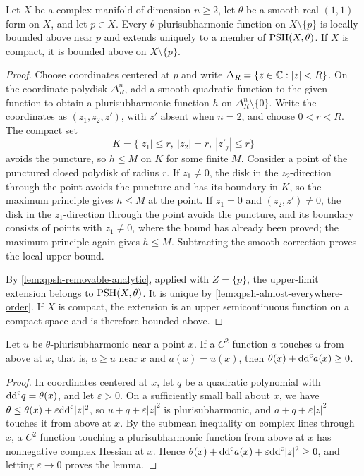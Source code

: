 \begin{lemma}\label{lem:projective-puncture-upper-bound}\label{lem:isolated-puncture-extension}
Let $X$ be a complex manifold of dimension $n\geq2$, let $\theta$ be a smooth real $(1,1)$-form on $X$, and let $p\in X$. Every $\theta$-plurisubharmonic function on $X\setminus\{p\}$ is locally bounded above near $p$ and extends uniquely to a member of $\mathrm{PSH}(X,\theta)$. If $X$ is compact, it is bounded above on $X\setminus\{p\}$.
\end{lemma}
\begin{proof}
Choose coordinates centered at $p$ and write $\Delta_R=\{z\in\mathbb C:|z|<R\}$. On the coordinate polydisk $\Delta_R^n$, add a smooth quadratic function to the given function to obtain a plurisubharmonic function $h$ on $\Delta_R^n\setminus\{0\}$. Write the coordinates as $(z_1,z_2,z')$, with $z'$ absent when $n=2$, and choose $0<r<R$. The compact set
\[
 K=\{|z_1|\leq r,\ |z_2|=r,\ |z'_j|\leq r\}
\]
avoids the puncture, so $h\leq M$ on $K$ for some finite $M$. Consider a point of the punctured closed polydisk of radius $r$. If $z_1\ne0$, the disk in the $z_2$-direction through the point avoids the puncture and has its boundary in $K$, so the maximum principle gives $h\leq M$ at the point. If $z_1=0$ and $(z_2,z')\ne0$, the disk in the $z_1$-direction through the point avoids the puncture, and its boundary consists of points with $z_1\neq0$, where the bound has already been proved; the maximum principle again gives $h\leq M$. Subtracting the smooth correction proves the local upper bound.

By \cref{lem:qpsh-removable-analytic}, applied with $Z=\{p\}$, the upper-limit extension belongs to $\mathrm{PSH}(X,\theta)$. It is unique by \cref{lem:qpsh-almost-everywhere-order}. If $X$ is compact, the extension is an upper semicontinuous function on a compact space and is therefore bounded above.
\end{proof}

\begin{lemma}\label{lem:qpsh-upper-test}
Let $u$ be $\theta$-plurisubharmonic near a point $x$. If a $C^2$ function $a$ touches $u$ from above at $x$, that is, $a\geq u$ near $x$ and $a(x)=u(x)$, then $\theta(x)+\mathrm{dd}^{\mathrm{c}} a(x)\geq0$.
\end{lemma}
\begin{proof}
In coordinates centered at $x$, let $q$ be a quadratic polynomial with $\mathrm{dd}^{\mathrm{c}} q=\theta(x)$, and let $\varepsilon>0$. On a sufficiently small ball about $x$, we have $\theta\leq\theta(x)+\varepsilon\mathrm{dd}^{\mathrm{c}}|z|^2$, so $u+q+\varepsilon|z|^2$ is plurisubharmonic, and $a+q+\varepsilon|z|^2$ touches it from above at $x$. By the submean inequality on complex lines through $x$, a $C^2$ function touching a plurisubharmonic function from above at $x$ has nonnegative complex Hessian at $x$. Hence $\theta(x)+\mathrm{dd}^{\mathrm{c}} a(x)+\varepsilon\mathrm{dd}^{\mathrm{c}}|z|^2\geq0$, and letting $\varepsilon\to0$ proves the lemma.
\end{proof}
